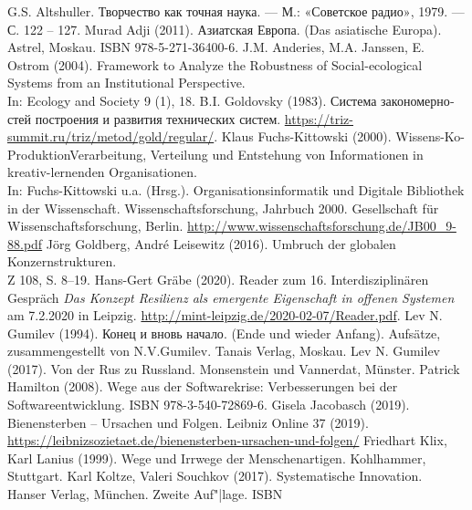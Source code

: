 \documentclass[11pt,a4paper]{article}
\begin{document}
\begin{thebibliography}{xxx}
 G.S. Altshuller. \foreignlanguage{russian}{Творчество
  как точная наука. — М.: «Советское радио»}, 1979. — С. 122 – 127.
 Murad Adji (2011). \foreignlanguage{russian}{Азиатская
  Европа}. (Das asiatische Europa).  Astrel, Moskau. ISBN 978-5-271-36400-6.
 J.M. Anderies, M.A. Janssen, E. Ostrom (2004).
  Framework to Analyze the Robustness of Social-ecological Systems from an
  Institutional Perspective.\\ In: Ecology and Society 9 (1), 18.
 B.I. Goldovsky (1983).
  \foreignlanguage{russian}{Система закономерностей построения и развития
    технических систем}.
  \url{https://triz-summit.ru/triz/metod/gold/regular/}.
 Klaus Fuchs-Kittowski (2000).
  Wissens-Ko-ProduktionVerarbeitung, Verteilung und Entstehung von
  Informationen in kreativ-lernenden Organisationen.\\ In: Fuchs-Kittowski
  u.a. (Hrsg.). Organisationsinformatik und Digitale Bibliothek in der
  Wissenschaft. Wissenschaftsforschung, Jahrbuch 2000. Gesellschaft für
  Wissenschaftsforschung, Berlin.
  \url{http://www.wissenschaftsforschung.de/JB00_9-88.pdf}
 Jörg Goldberg, André Leisewitz (2016). Umbruch der
  globalen Konzernstrukturen.\\ Z 108, S. 8--19.
 Hans-Gert Gräbe (2020). Reader zum 16. Interdisziplinären
  Gespräch \emph{Das Konzept Resilienz als emergente Eigenschaft in offenen
    Systemen} am 7.2.2020 in
  Leipzig. \url{http://mint-leipzig.de/2020-02-07/Reader.pdf}.
 Lev N. Gumilev (1994). \foreignlanguage{russian}{Конец и
  вновь начало}.  (Ende und wieder Anfang).  Aufsätze, zusammengestellt von
  N.V.Gumilev. Tanais Verlag, Moskau.
 Lev N. Gumilev (2017). Von der Rus zu Russland.
  Monsenstein und Vannerdat, Münster.
 Patrick Hamilton (2008). Wege aus der Softwarekrise:
  Verbesserungen bei der Softwareentwicklung. ISBN 978-3-540-72869-6.
 Gisela Jacobasch (2019). Bienensterben -- Ursachen und
  Folgen.  Leibniz Online 37 (2019).
  \url{https://leibnizsozietaet.de/bienensterben-ursachen-und-folgen/}
 Friedhart Klix, Karl Lanius (1999). Wege und Irrwege
  der Menschenartigen.  Kohlhammer, Stuttgart.
 Karl Koltze, Valeri Souchkov (2017).
  Systematische Innovation.\\ Hanser Verlag, München. Zweite Auf"|lage. ISBN

\end{thebibliography}
\end{document}
